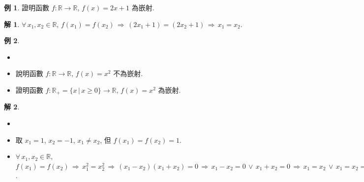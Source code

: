 \documentclass[12pt]{extarticle}
\newcommand{\ds}{\displaystyle}
\newcommand{\ie}{\,\Longrightarrow\,}
\theoremstyle{definition}
\newtheorem*{ex}{例}
\newtheorem*{rmk}{註}
\newtheorem*{sol}{解}
\newcommand{\myline}{\noindent\makebox[\linewidth]{\rule{\paperwidth}{0.4pt}}}
\begin{document}
\myline


\begin{ex}
  證明函數 $f:\mathbb{R}\to\mathbb{R}$, $f(x) = 2x + 1$ 為嵌射. 
\end{ex}

\begin{sol}
  $\forall\,x_1, x_2\in\mathbb{R}$, $f(x_1) = f(x_2) \ie (2 x_1 + 1) = (2 x_2 + 1) \ie x_1 = x_2$.  
\end{sol}

\begin{ex}
  \begin{itemize}\setlength\itemsep{0em}
    \item[]
    \item 說明函數 $f:\mathbb{R}\to\mathbb{R}$, $f(x) = x^2$ 不為嵌射. 
    \item 證明函數 $f:\mathbb{R}_+= \{x\,|\,x\geqslant 0\}\to\mathbb{R}$, $f(x) = x^2$ 為嵌射.
  \end{itemize}
\end{ex}

\begin{sol}
  \begin{itemize}\setlength\itemsep{0em}
    \item[]
    \item 取 $x_1 = 1$, $x_2 = -1$, $x_1\ne x_2$, 但 $f(x_1) = f(x_2) = 1$.  
    \item $\forall\,x_1, x_2\in\mathbb{R}$, $\ds f(x_1) = f(x_2) \ie x_1^2 = x_2^2 \ie (x_1 - x_2)(x_1 + x_2) = 0 \ie x_1 - x_2 = 0 \,\vee\, x_1 + x_2 = 0 \ie x_1 = x_2 \,\vee\, x_1 = x_2 = 0\ie x_1 = x_2$.  
  \end{itemize}
\end{sol}
\end{document}
